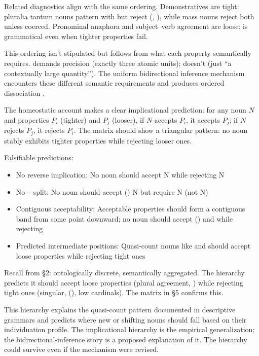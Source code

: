 \documentclass[12pt,a4paper]{article}
\begin{document}
Related diagnostics align with the same ordering. Demonstratives are tight: pluralia tantum nouns pattern with  but reject  (, ), while mass nouns reject both unless coerced. Pronominal anaphora and subject--verb agreement are loose:  is grammatical even when tighter properties fail.

This ordering isn't stipulated but follows from what each property semantically requires.  demands precision (exactly three atomic units);  doesn't (just \enquote{a contextually large quantity}). The uniform bidirectional inference mechanism encounters these different semantic requirements and produces ordered dissociation \citep{allan1980,grimm2018}.

The homeostatic account makes a clear implicational prediction: for any noun $N$ and properties $P_i$ (tighter) and $P_j$ (looser), if $N$ accepts $P_i$, it accepts $P_j$; if $N$ rejects $P_j$, it rejects $P_i$. The matrix should show a triangular pattern: no noun stably exhibits tighter properties while rejecting looser ones.

Falsifiable predictions:
\begin{itemize}
\item No reverse implication: No noun should accept  N while rejecting  N
\item No -- split: No noun should accept () N but require  N (not  N)
\item Contiguous acceptability: Acceptable properties should form a contiguous band from some point downward; no noun should accept () and  while rejecting 
\item Predicted intermediate positions: Quasi-count nouns like  and  should accept loose properties while rejecting tight ones
\end{itemize}

Recall  from \S2: ontologically discrete, semantically aggregated. The hierarchy predicts it should accept loose properties (plural agreement, ) while rejecting tight ones (singular, (), low cardinals). The matrix in \S5 confirms this.

This hierarchy explains the quasi-count pattern documented in descriptive grammars and predicts where new or shifting nouns should fall based on their individuation profile. The implicational hierarchy is the empirical generalization; the bidirectional-inference story is a proposed explanation of it. The hierarchy could survive even if the mechanism were revised.
\end{document}
